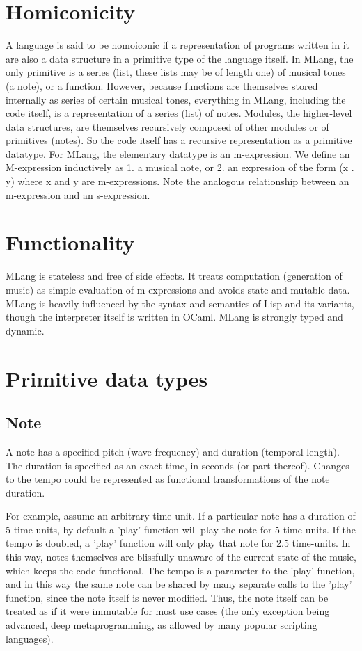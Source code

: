 \documentclass{article}
\begin{document}
\section{Homiconicity}

A language is said to be homoiconic if a representation of programs written in it are also a data structure in a primitive type of the language itself. In MLang, the only primitive is a series (list, these lists may be of length one) of musical tones (a note), or a function. However, because functions are themselves stored internally as series of certain musical tones, everything in MLang, including the code itself, is a representation of a series (list) of notes. Modules, the higher-level data structures, are themselves recursively composed of other modules or of primitives (notes). So the code itself has a recursive representation as a primitive datatype. For MLang, the elementary datatype is an m-expression. We define an M-expression inductively as 
1. a musical note, or
2. an expression of the form (x . y) where x and y are m-expressions.
Note the analogous relationship between an m-expression and an s-expression.




\section{Functionality}

MLang is stateless and free of side effects. It treats computation (generation of music) as simple evaluation of m-expressions and avoids state and mutable data. MLang is heavily influenced by the syntax and semantics of Lisp and its variants, though the interpreter itself is written in OCaml. MLang is strongly typed and dynamic.




\section{Primitive data types}


\subsection{Note}
A note has a specified pitch (wave frequency) and duration (temporal length).
The duration is specified as an exact time, in seconds (or part thereof). Changes to the tempo could be represented as functional transformations of the note duration. 


For example, assume an arbitrary time unit. If a particular note has a duration of 5 time-units, by default a 'play' function will play the note for 5 time-units. If the tempo is doubled, a 'play' function will only play that note for 2.5 time-units. In this way, notes themselves are blissfully unaware of the current state of the music, which keeps the code functional. The tempo is a parameter to the 'play' function, and in this way the same note can be shared by many separate calls to the 'play' function, since the note itself is never modified. Thus, the note itself can be treated as if it were immutable for most use cases (the only exception being advanced, deep metaprogramming, as allowed by many popular scripting languages).
\end{document}
